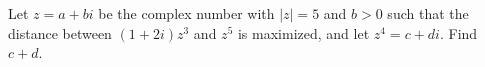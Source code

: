 Let $z = a + bi$ be the complex number with $|z| = 5$ and $b > 0$ such that the distance between $(1 + 2i)z^3$ and $z^5$ is maximized, and let $z^4 = c + di$.
Find $c+d$.